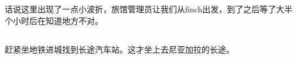 ﻿\documentclass[hyperref={bookmarks=true},xcolor=pdflatex,svgnames,table,compress]{beamer}
\begin{document}
\subsection{}
\begin{frame}
\end{frame}

\subsection{}
\begin{frame}
\end{frame}

\subsection{}
\begin{frame}
\end{frame}

\subsection{}
\begin{frame}
\end{frame}

\subsection{}
\begin{frame}
\begin{ztebox}
话说这里出现了一点小波折，旅馆管理员让我们从finch出发，到了之后等了大半个小时后在知道地方不对。
\end{ztebox}
\end{frame}

\subsection{}
\begin{frame}
\begin{ztebox}
赶紧坐地铁进城找到长途汽车站。这才坐上去尼亚加拉的长途。
\end{ztebox}
\end{frame}


\subsection{}
\begin{frame}
\end{frame}
\end{document}
